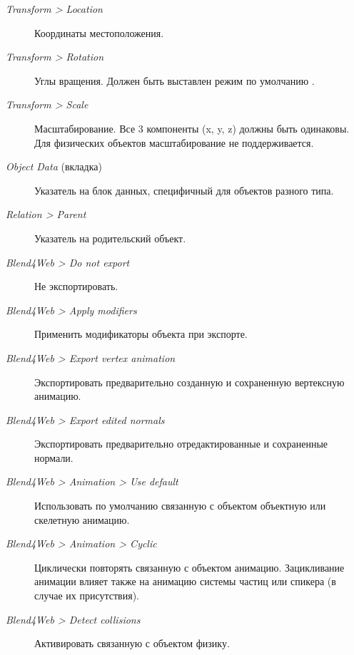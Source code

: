 \documentclass[a4paper,12pt,oneside]{sphinxmanual}
\begin{document}
\begin{description}
\item[{\emph{Transform \textgreater{} Location}}] \leavevmode
Координаты местоположения.

\item[{\emph{Transform \textgreater{} Rotation}}] \leavevmode
Углы вращения. Должен быть выставлен режим по умолчанию .

\item[{\emph{Transform \textgreater{} Scale}}] \leavevmode
Масштабирование. Все 3 компоненты (x, y, z) должны быть одинаковы. Для физических объектов масштабирование не поддерживается.

\item[{\emph{Object Data} (вкладка)}] \leavevmode
Указатель на блок данных, специфичный для объектов разного типа.

\item[{\emph{Relation \textgreater{} Parent}}] \leavevmode
Указатель на родительский объект.

\item[{\emph{Blend4Web \textgreater{} Do not export}}] \leavevmode
Не экспортировать.

\item[{\emph{Blend4Web \textgreater{} Apply modifiers}}] \leavevmode
Применить модификаторы объекта при экспорте.

\item[{\emph{Blend4Web \textgreater{} Export vertex animation}}] \leavevmode
Экспортировать предварительно созданную и сохраненную вертексную анимацию.

\item[{\emph{Blend4Web \textgreater{} Export edited normals}}] \leavevmode
Экспортировать предварительно отредактированные и сохраненные нормали.

\item[{\emph{Blend4Web \textgreater{} Animation \textgreater{} Use default}}] \leavevmode
Использовать по умолчанию связанную с объектом объектную или скелетную анимацию.

\item[{\emph{Blend4Web \textgreater{} Animation \textgreater{} Cyclic}}] \leavevmode
Циклически повторять связанную с объектом анимацию. Зацикливание анимации влияет также на анимацию системы частиц или спикера (в случае их присутствия).

\item[{\emph{Blend4Web \textgreater{} Detect collisions}}] \leavevmode
Активировать связанную с объектом физику.


\end{description}
\end{document}
